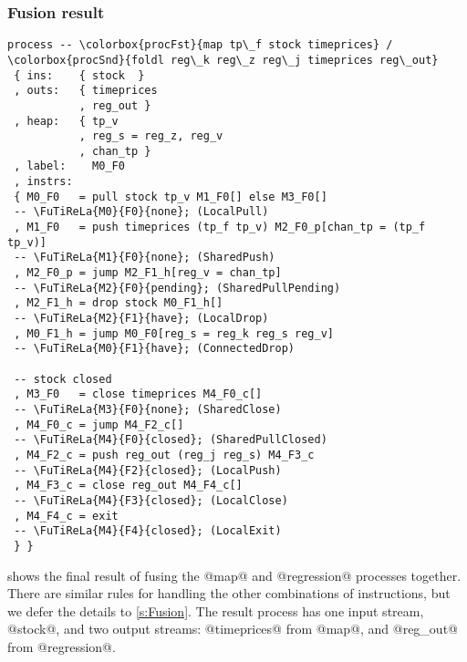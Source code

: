 \subsubsection{Fusion result}


\begin{lstlisting}[language=process,float,caption={Fusion of \colorbox{procFst}{timeprices} and \colorbox{procSnd}{regression}, along with \colorbox{procCommon}{shared} instructions and variables},label=figs/procs/instance/fused-timeprices-regression,linebackgroundcolor={
  \hilineFst{2}
  \hilineFst{3}
  \hilineSnd{4}
  \hilineFst{5}
  \hilineSnd{6}
  \hilineCom{7}
  \hilineFst{10}
  \hilineFst{11}
  \hilineFst{12}
  \hilineFst{13}
  \hilineSnd{14}
  \hilineSnd{15}
  \hilineFst{16}
  \hilineFst{17}
  \hilineSnd{18}
  \hilineSnd{19}
  \hilineFst{22}
  \hilineFst{23}
  \hilineSnd{24}
  \hilineSnd{25}
  \hilineSnd{26}
  \hilineSnd{27}
  \hilineSnd{28}
  \hilineSnd{29}
  \hilineCom{30}
  \hilineCom{31}
  }]
process -- \colorbox{procFst}{map tp\_f stock timeprices} / \colorbox{procSnd}{foldl reg\_k reg\_z reg\_j timeprices reg\_out}
 { ins:    { stock  }
 , outs:   { timeprices
           , reg_out }
 , heap:   { tp_v
           , reg_s = reg_z, reg_v
           , chan_tp }
 , label:    M0_F0
 , instrs:
 { M0_F0   = pull stock tp_v M1_F0[] else M3_F0[]
 -- \FuTiReLa{M0}{F0}{none}; (LocalPull)
 , M1_F0   = push timeprices (tp_f tp_v) M2_F0_p[chan_tp = (tp_f tp_v)]
 -- \FuTiReLa{M1}{F0}{none}; (SharedPush)
 , M2_F0_p = jump M2_F1_h[reg_v = chan_tp]
 -- \FuTiReLa{M2}{F0}{pending}; (SharedPullPending)
 , M2_F1_h = drop stock M0_F1_h[] 
 -- \FuTiReLa{M2}{F1}{have}; (LocalDrop)
 , M0_F1_h = jump M0_F0[reg_s = reg_k reg_s reg_v]
 -- \FuTiReLa{M0}{F1}{have}; (ConnectedDrop)

 -- stock closed
 , M3_F0   = close timeprices M4_F0_c[] 
 -- \FuTiReLa{M3}{F0}{none}; (SharedClose)
 , M4_F0_c = jump M4_F2_c[] 
 -- \FuTiReLa{M4}{F0}{closed}; (SharedPullClosed)
 , M4_F2_c = push reg_out (reg_j reg_s) M4_F3_c 
 -- \FuTiReLa{M4}{F2}{closed}; (LocalPush)
 , M4_F3_c = close reg_out M4_F4_c[] 
 -- \FuTiReLa{M4}{F3}{closed}; (LocalClose)
 , M4_F4_c = exit
 -- \FuTiReLa{M4}{F4}{closed}; (LocalExit)
 } }
\end{lstlisting}

 shows the final result of fusing the @map@ and @regression@ processes together.
There are similar rules for handling the other combinations of instructions, but we defer the details to \cref{s:Fusion}.
The result process has one input stream, @stock@, and two output streams: @timeprices@ from @map@, and @reg_out@ from @regression@.

